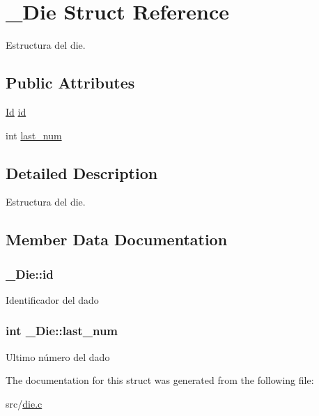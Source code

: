 \hypertarget{struct__Die}{\section{\+\_\+\+Die Struct Reference}
\label{struct__Die}
}


Estructura del die.  


\subsection*{Public Attributes}
\begin{DoxyCompactItemize}
\item 
\hyperlink{types_8h_a845e604fb28f7e3d97549da3448149d3}{Id} \hyperlink{struct__Die_a0887af562dda760409957f13619d36f1}{id}
\item 
int \hyperlink{struct__Die_a32eb6d76a658d00832c484818879d071}{last\+\_\+num}
\end{DoxyCompactItemize}


\subsection{Detailed Description}
Estructura del die. 

\subsection{Member Data Documentation}
\hypertarget{struct__Die_a0887af562dda760409957f13619d36f1}{
\subsubsection[{id}]{ \+\_\+\+Die\+::id}}\label{struct__Die_a0887af562dda760409957f13619d36f1}
Identificador del dado \hypertarget{struct__Die_a32eb6d76a658d00832c484818879d071}{
\subsubsection[{last\+\_\+num}]{\setlength{\rightskip}{0pt plus 5cm}int \+\_\+\+Die\+::last\+\_\+num}}\label{struct__Die_a32eb6d76a658d00832c484818879d071}
Ultimo número del dado 

The documentation for this struct was generated from the following file\+:\begin{DoxyCompactItemize}
\item 
src/\hyperlink{die_8c}{die.\+c}\end{DoxyCompactItemize}
